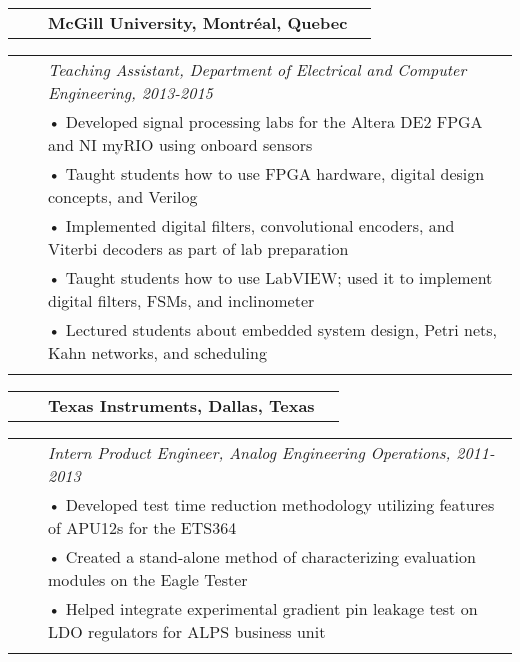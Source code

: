 \documentclass{minimal}
\begin{document}
\pagebreak

\begin{tabular}{ p{1.5cm} p{1cm} p{10cm} >{\raggedleft\arraybackslash}p{3cm} }
& & \textbf{McGill University, Montréal, Quebec} & \\
\end{tabular}

\begin{tabular}{ p{1.5cm} p{1cm} p{16cm} }
& & \textit{Teaching Assistant, Department of Electrical and Computer Engineering, 2013-2015}\\
& & • Developed signal processing labs for the Altera DE2 FPGA and NI myRIO using onboard sensors\\
& & • Taught students how to use FPGA hardware, digital design concepts, and Verilog\\
& & • Implemented digital filters, convolutional encoders, and Viterbi decoders as part of lab preparation\\
& & • Taught students how to use LabVIEW; used it to implement digital filters, FSMs, and inclinometer\\
& & • Lectured students about embedded system design, Petri nets, Kahn networks, and scheduling\\
& & \\
\end{tabular}

\begin{tabular}{ p{1.5cm} p{1cm} p{10cm} >{\raggedleft\arraybackslash}p{3cm} }
& & \textbf{Texas Instruments, Dallas, Texas} & \\
\end{tabular}

\begin{tabular}{ p{1.5cm} p{1cm} p{16cm} }
& & \textit{Intern Product Engineer, Analog Engineering Operations, 2011-2013}\\
& & • Developed test time reduction methodology utilizing features of APU12s for the ETS364\\
& & • Created a stand-alone method of characterizing evaluation modules on the Eagle Tester\\
& & • Helped integrate experimental gradient pin leakage test on LDO regulators for ALPS business unit\\
& & \\
\end{tabular}
\end{document}

